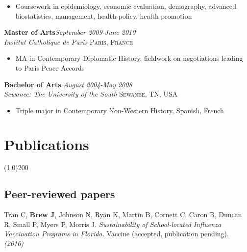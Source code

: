 \documentclass[11pt]{article}
\begin{document}
\vspace{-2mm}
\begin{itemize}\itemsep0pt \parskip0pt 
\item Coursework in epidemiology, economic evaluation, demography, advanced biostatistics, management, health policy, health promotion
\end{itemize}


\noindent \textbf{Master of Arts}\hfill \emph{September 2009-June 2010}\\
\noindent \emph{Institut Catholique de Paris} \hfill \textsc{Paris, France}
\vspace{-2mm}
\begin{itemize}\itemsep0pt \parskip0pt 
\item MA in Contemporary Diplomatic History, fieldwork on negotiations leading to Paris Peace Accords
\end{itemize}

\noindent \textbf{Bachelor of Arts} \hfill \emph{August 2004-May 2008}\\
\noindent \emph{Sewanee: The University of the South} \hfill \textsc{Sewanee, TN, USA}
\vspace{-2mm}
\begin{itemize}\itemsep0pt \parskip0pt 
\item Triple major in Contemporary Non-Western History, Spanish, French
\end{itemize}


\newpage

\section*{Publications} %
\vspace{-7mm}
\line(1,0){200}
\vspace{2mm}


\subsection*{Peer-reviewed papers}

\noindent Tran C, \textbf{Brew J}, Johnson N, Ryan K, Martin B, Cornett C, Caron B, Duncan R, Small P, Myers P, Morris J. \emph{Sustainability of School-located Influenza Vaccination Programs in Florida.} Vaccine (accepted, publication pending). \\
 \hfill \emph{(2016)} \\
\end{document}
